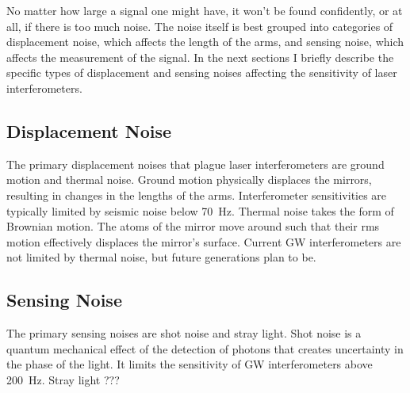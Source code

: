No matter how large a signal one might have, it won't be found
confidently, or at all, if there is too much noise. The noise itself
is best grouped into categories of displacement noise, which affects
the length of the arms, and sensing noise, which affects the
measurement of the signal. In the next sections I briefly describe the
specific types of displacement and sensing noises affecting the
sensitivity of laser interferometers.




\subsection{Displacement Noise} 
The primary displacement noises that plague laser interferometers are
ground motion and thermal noise. Ground motion physically displaces
the mirrors, resulting in changes in the lengths of the
arms. Interferometer sensitivities are typically limited by seismic noise below
70~Hz. Thermal noise takes the form of Brownian motion. The atoms of
the mirror move around such that their rms motion effectively
displaces the mirror's surface. Current GW interferometers are not
limited by thermal noise, but future generations plan to be. 



\subsection{Sensing Noise}
The primary sensing noises are shot noise and stray light. Shot noise
is a quantum mechanical effect of the detection of photons that
creates uncertainty in the phase of the light. It limits the
sensitivity of GW interferometers above 200~Hz. Stray light ???













